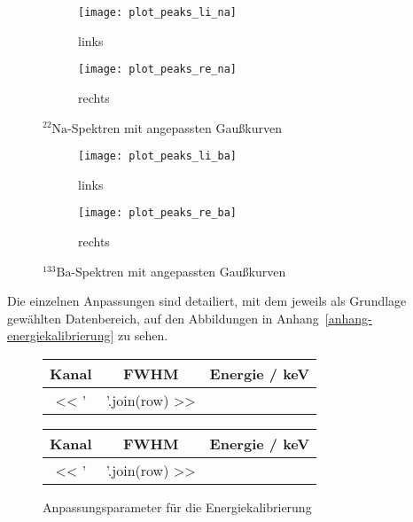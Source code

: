 \documentclass[11pt, ngerman, fleqn, DIV=15, headinclude, BCOR=2cm]{scrreprt}
\begin{document}
\begin{figure}
	\centering
	\begin{subfigure}{0.49 \textwidth}
		\texttt{[image: plot\_peaks\_li\_na]}
		\caption{%
			links
		}
		\label{fig:na_peaks-li_plot}
	\end{subfigure}
	\begin{subfigure}{0.49 \textwidth}
		\texttt{[image: plot\_peaks\_re\_na]}
		\caption{%
			rechts
		}
		\label{fig:na_peaks-re_plot}
	\end{subfigure}
	\caption{%
		$^{22}\text{Na}$-Spektren mit angepassten Gaußkurven
	}
	\label{fig:na_peaks_plot}
\end{figure}

\begin{figure}
	\centering
	\begin{subfigure}{0.49 \textwidth}
		\texttt{[image: plot\_peaks\_li\_ba]}
		\caption{%
			links
		}
		\label{fig:ba_peaks-li_plot}
	\end{subfigure}
	\begin{subfigure}{0.49 \textwidth}
		\texttt{[image: plot\_peaks\_re\_ba]}
		\caption{%
			rechts
		}
		\label{fig:ba_peaks-re_plot}
	\end{subfigure}
	\caption{%
		$^{133}\text{Ba}$-Spektren mit angepassten Gaußkurven
	}
	\label{fig:ba_peaks_plot}
\end{figure}

Die einzelnen Anpassungen sind detailiert, mit dem jeweils als Grundlage
gewählten Datenbereich, auf den Abbildungen in
Anhang~\ref{anhang-energiekalibrierung} zu sehen.

\begin{figure}
    \begin{minipage}[t]{0.45\textwidth}
	\centering
	\begin{tabular}{SSS}
		{Kanal} &
		{FWHM} &
		{Energie / \si{\kilo\electronvolt}}\\
		\midrule
		<< ' & '.join(row) >> \\
	\end{tabular}
    \end{minipage}
    \hfill
    \begin{minipage}[t]{0.45\textwidth}
        \centering
        \begin{tabular}{SSS}
		{Kanal} &
		{FWHM} &
		{Energie / \si{\kilo\electronvolt}}\\
		\midrule
		<< ' & '.join(row) >> \\
	\end{tabular}
    \end{minipage}
	\caption{%
		Anpassungsparameter für die Energiekalibrierung
	}
	\label{tab:energiekalibrierung}
\end{figure}
\end{document}
